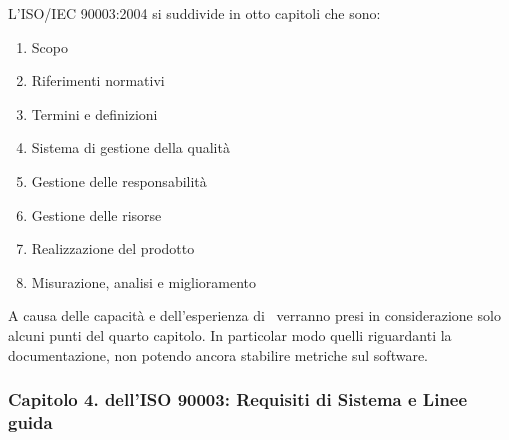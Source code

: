 	L'ISO/IEC 90003:2004 si suddivide in otto capitoli che sono:
	
	\begin{enumerate}
		\item Scopo
		\item Riferimenti normativi
		\item Termini e definizioni
		\item Sistema di gestione della qualità
		\item Gestione delle responsabilità
		\item Gestione delle risorse
		\item Realizzazione del prodotto
		\item Misurazione, analisi e miglioramento
	\end{enumerate}

	A causa delle capacità e dell'esperienza di \gruppo\, verranno presi in considerazione solo alcuni punti del quarto capitolo. In particolar modo quelli riguardanti la documentazione, non potendo ancora stabilire metriche sul software.
	
	\subsubsection{Capitolo 4. dell'ISO 90003: Requisiti di Sistema e Linee guida}
	
